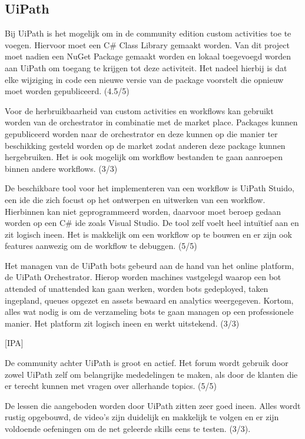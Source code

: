 \subsection{UiPath}
Bij UiPath is het mogelijk om in de community edition custom activities toe te voegen. Hiervoor moet een C\# Class Library gemaakt worden. Van dit project moet nadien een NuGet Package gemaakt worden en lokaal toegevoegd worden aan UiPath om toegang te krijgen tot deze activiteit. Het nadeel hierbij is dat elke wijziging in code een nieuwe versie van de package voorstelt die opnieuw moet worden gepubliceerd. (4.5/5)

Voor de herbruikbaarheid van custom activities en workflows kan gebruikt worden van de orchestrator in combinatie met de market place. Packages kunnen gepubliceerd worden naar de orchestrator en deze kunnen op die manier ter beschikking gesteld worden op de market zodat anderen deze package kunnen hergebruiken. Het is ook mogelijk om workflow bestanden te gaan aanroepen binnen andere workflows. (3/3) 

De beschikbare tool voor het implementeren van een workflow is UiPath Stuido, een ide die zich focust op het ontwerpen en uitwerken van een workflow. Hierbinnen kan niet geprogrammeerd worden, daarvoor moet beroep gedaan worden op een C\# ide zoals Visual Studio. De tool zelf voelt heel intuïtief aan en zit logisch ineen. Het is makkelijk om een workflow op te bouwen en er zijn ook features aanwezig om de workflow te debuggen. (5/5)

Het managen van de UiPath bots gebeurd aan de hand van het online platform, de UiPath Orchestrator. Hierop worden machines vastgelegd waarop een bot attended of unattended kan gaan werken, worden bots gedeployed, taken ingepland, queues opgezet en assets bewaard en analytics weergegeven. Kortom, alles wat nodig is om de verzameling bots te gaan managen op een professionele manier. Het platform zit logisch ineen en werkt uitstekend. (3/3)

[IPA]

De community achter UiPath is groot en actief. Het forum wordt gebruik door zowel UiPath zelf om belangrijke mededelingen te maken, als door de klanten die er terecht kunnen met vragen over allerhande topics. (5/5)

De lessen die aangeboden worden door UiPath zitten zeer goed ineen. Alles wordt rustig opgebouwd, de video's zijn duidelijk en makkelijk te volgen en er zijn voldoende oefeningen om de net geleerde skills eens te testen. (3/3).

